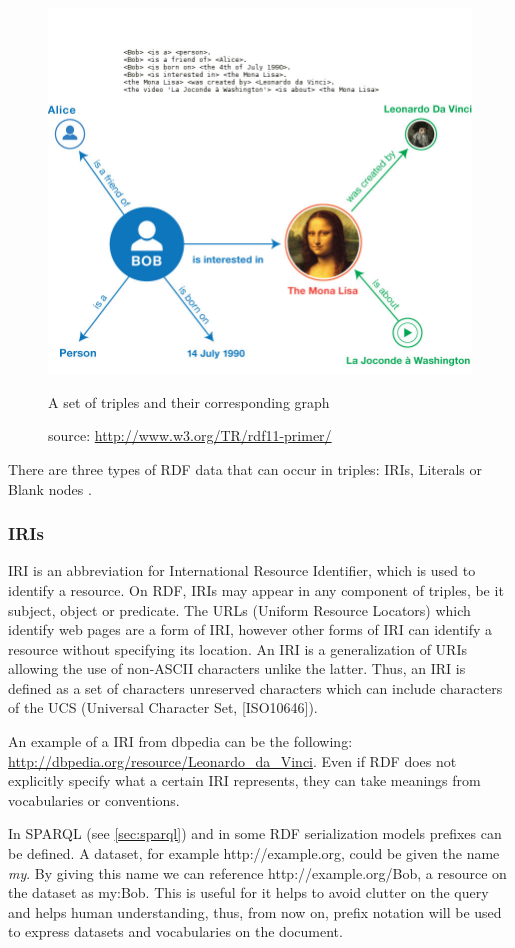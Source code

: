 \begin{figure}[h]
  \centering
  \includegraphics[width=.6\textwidth]{fig/rdfgraph}
  \caption{A set of triples and their corresponding graph}
  \caption*{source: \url{http://www.w3.org/TR/rdf11-primer/}}
  \label{fig:rdfgraph}
\end{figure} 

There are three types of RDF data that can occur in triples: IRIs, Literals or Blank nodes \cite{rdfprimer11}.

\subsubsection*{IRIs}

IRI is an abbreviation for International Resource Identifier, which is used to identify a resource. On RDF, IRIs may appear in any component of triples, be it subject, object or predicate. The URLs (Uniform Resource Locators) which identify web pages are a form of IRI, however other forms of IRI can identify a resource without specifying its location. An IRI is a generalization of URIs allowing the use of non-ASCII characters unlike the latter. Thus, an IRI is defined as a set of characters unreserved characters which can include characters of the UCS \cite{rfc3986,rfc3987}(Universal Character Set, [ISO10646]).

An example of a IRI from dbpedia can be the following: \url{http://dbpedia.org/resource/Leonardo_da_Vinci}. Even if RDF does not explicitly specify what a certain IRI represents, they can take meanings from vocabularies or conventions.

In SPARQL (see \ref{sec:sparql}) and in some RDF serialization models prefixes can be defined. A dataset, for example http://example.org, could be given the name \textit{my}. By giving this name we can reference http://example.org/Bob, a resource on the dataset as my:Bob. This is useful for it helps to avoid clutter on the query and helps human understanding, thus, from now on, prefix notation will be used to express datasets and vocabularies on the document.

